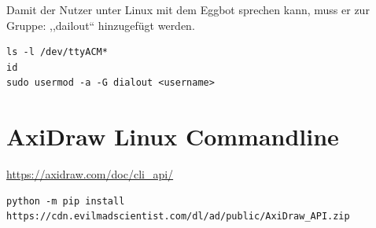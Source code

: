 Damit der Nutzer unter Linux mit dem Eggbot sprechen kann, muss er zur Gruppe: ,,dailout`` hinzugefügt werden.\\
\begin{verbatim}
ls -l /dev/ttyACM*
id
sudo usermod -a -G dialout <username>
\end{verbatim}
\section{AxiDraw Linux Commandline}
\url{https://axidraw.com/doc/cli_api/}
\begin{verbatim}
python -m pip install https://cdn.evilmadscientist.com/dl/ad/public/AxiDraw_API.zip
\end{verbatim}



